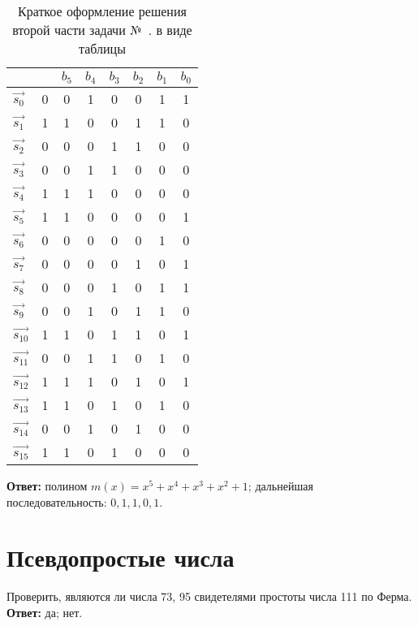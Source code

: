 \begin{itemize}
\begin{table}[!thb]
\begin{tabular}{ l | c || c c c c c|| c }
		 & & $b_{5}$& $b_{4}$& $b_{3}$& $b_{2}$& $b_{1}$ & $b_0$ \\
		  \hline
		  $\overrightarrow {s_{0}}$ & 0 & 0 & 1 & 0 & 0 & 1& 1 \\
		  \hline
		  $\overrightarrow {s_{1}}$ & 1 & 1 & 0 & 0 & 1 & 1& 0 \\
		  $\overrightarrow {s_{2}}$ & 0 & 0 & 0 & 1 & 1 & 0& 0 \\
		  $\overrightarrow {s_{3}}$ & 0 & 0 & 1 & 1 & 0 & 0& 0 \\
		  $\overrightarrow {s_{4}}$ & 1 & 1 & 1 & 0 & 0 & 0& 0 \\
		  $\overrightarrow {s_{5}}$ & 1 & 1 & 0 & 0 & 0 & 0& 1 \\
		  \hline
		  $\overrightarrow {s_{6}}$ & 0 & 0 & 0 & 0 & 0 & 1& 0 \\
		  $\overrightarrow {s_{7}}$ & 0 & 0 & 0 & 0 & 1 & 0& 1 \\
		  $\overrightarrow {s_{8}}$ & 0 & 0 & 0 & 1 & 0 & 1& 1 \\
		  $\overrightarrow {s_{9}}$ & 0 & 0 & 1 & 0 & 1 & 1& 0 \\
		  $\overrightarrow {s_{10}}$ & 1 & 1 & 0 & 1 & 1 & 0& 1 \\
		  \hline
		  $\overrightarrow {s_{11}}$ & 0 & 0 & 1 & 1 & 0 & 1& 0 \\
		  $\overrightarrow {s_{12}}$ & 1 & 1 & 1 & 0 & 1 & 0& 1 \\
		  $\overrightarrow {s_{13}}$ & 1 & 1 & 0 & 1 & 0 & 1& 0 \\
		  $\overrightarrow {s_{14}}$ & 0 & 0 & 1 & 0 & 1 & 0& 0 \\
		  $\overrightarrow {s_{15}}$ & 1 & 1 & 0 & 1 & 0 & 0& 0 \\
		\hline
		\end{tabular}
		\caption{Краткое оформление решения второй части задачи №~. в виде таблицы}
		\label{table:task-lfsr-2-short-solution}
	\end{table}
\end{itemize}
\medbreak
\textbf{Ответ:} полином $m \left( x \right) = x^{5} + x^{4} + x^{3} + x^{2} + 1$; дальнейшая последовательность: $0,1,1,0,1$.

\section{Псевдопростые числа}
\tasksection

\tasknumber Проверить, являются ли числа 73, 95 свидетелями простоты числа 111 по Ферма.
\medbreak
\textbf{Ответ:} да; нет.
\bigbreak

